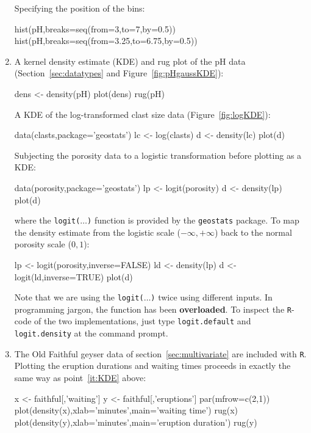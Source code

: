 \begin{enumerate}
Specifying the position of the bins:

\begin{script}[firstnumber=3]
hist(pH,breaks=seq(from=3,to=7,by=0.5))
hist(pH,breaks=seq(from=3.25,to=6.75,by=0.5))
\end{script}

\item\label{it:KDE} A kernel density estimate (KDE) and rug plot of
  the pH data (Section~\ref{sec:datatypes} and
  Figure~\ref{fig:pHgaussKDE}):

\begin{script}
dens <- density(pH)
plot(dens)
rug(pH)    
\end{script}

A KDE of the log-transformed clast size data
(Figure~\ref{fig:logKDE}):

\begin{script}
data(clasts,package='geostats')
lc <- log(clasts)
d <- density(lc)
plot(d)
\end{script}

Subjecting the porosity data to a logistic transformation before
plotting as a KDE:

\begin{script}
data(porosity,package='geostats')
lp <- logit(porosity)
d <- density(lp)
plot(d)
\end{script}

\noindent where the \texttt{logit($\ldots$)} function is provided by
the \texttt{geostats} package. To map the density estimate from the
logistic scale ($-\infty,+\infty$) back to the normal porosity scale
($0,1$):

\begin{script}[firstnumber=2]
lp <- logit(porosity,inverse=FALSE)
ld <- density(lp)
d <- logit(ld,inverse=TRUE)
plot(d)
\end{script}

Note that we are using the \texttt{logit($\ldots$)} twice using
different inputs. In programming jargon, the function has been
\textbf{overloaded}. To inspect the \texttt{R}-code of the two
implementations, just type \texttt{logit.default} and
\texttt{logit.density} at the command prompt.

\item The Old Faithful geyser data of section~\ref{sec:multivariate}
  are included with \texttt{R}. Plotting the eruption durations and
  waiting times proceeds in exactly the same way as point~\ref{it:KDE}
  above:

\begin{script}
x <- faithful[,'waiting']
y <- faithful[,'eruptions']
par(mfrow=c(2,1))
plot(density(x),xlab='minutes',main='waiting time')
rug(x)
plot(density(y),xlab='minutes',main='eruption duration')
rug(y)
\end{script}


\end{enumerate}
